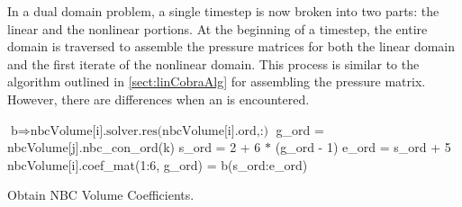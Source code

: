 In a dual domain problem, a single timestep is now broken into two parts: the linear and the nonlinear portions.
At the beginning of a timestep, the entire domain is traversed to assemble the pressure matrices for both the linear domain and the first iterate of the nonlinear domain.
This process is similar to the algorithm outlined in \ref{sect:linCobraAlg} for assembling the pressure matrix.
However, there are differences when an  is encountered.
%
%

\begin{algo}[ht!]
\setlength{\baselineskip}{0.625\baselineskip}
\begin{algorithmic}[1]
	\Set $\text{b} \Rightarrow \text{nbcVolume[i].solver.res(nbcVolume[i].ord,:)}$
			\Set g\_ord = nbcVolume[j].nbc\_con\_ord(k)
			\Set s\_ord = 2 + 6 $*$ (g\_ord - 1)
			\Set e\_ord = s\_ord + 5
			\Set nbcVolume[i].coef\_mat(1:6, g\_ord) = b(s\_ord:e\_ord)
		\EndFor
	\EndFor
\EndFor
\end{algorithmic}
\caption{Obtain NBC Volume Coefficients.}
\label{alg:domDecompGetCoef}
\end{algo}

